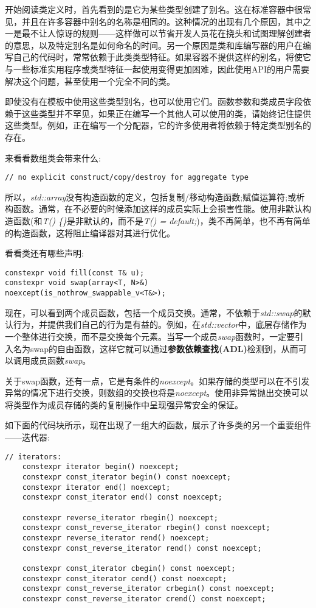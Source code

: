 开始阅读类定义时，首先看到的是它为某些类型创建了别名。这在标准容器中很常见，并且在许多容器中别名的名称是相同的。这种情况的出现有几个原因，其中之一是最不让人惊讶的规则——这样做可以节省开发人员花在挠头和试图理解创建者的意思，以及特定别名是如何命名的时间。另一个原因是类和库编写器的用户在编写自己的代码时，常常依赖于此类类型特征。如果容器不提供这样的别名，将使它与一些标准实用程序或类型特征一起使用变得更加困难，因此使用API的用户需要解决这个问题，甚至使用一个完全不同的类。

即使没有在模板中使用这些类型别名，也可以使用它们。函数参数和类成员字段依赖于这些类型并不罕见，如果正在编写一个其他人可以使用的类，请始终记住提供这些类型。例如，正在编写一个分配器，它的许多使用者将依赖于特定类型别名的存在。

来看看数组类会带来什么:

\begin{lstlisting}[style=styleCXX]
// no explicit construct/copy/destroy for aggregate type
\end{lstlisting}

所以，\textit{std::array}没有构造函数的定义，包括复制/移动构造函数;赋值运算符;或析构函数。通常，在不必要的时候添加这样的成员实际上会损害性能。使用非默认构造函数(和\textit{T() \{\}}是非默认的，而不是\textit{T() = default;})，类不再简单，也不再有简单的构造函数，这将阻止编译器对其进行优化。

看看类还有哪些声明:

\begin{lstlisting}[style=styleCXX]
constexpr void fill(const T& u);
constexpr void swap(array<T, N>&) noexcept(is_nothrow_swappable_v<T&>);
\end{lstlisting}

现在，可以看到两个成员函数，包括一个成员交换。通常，不依赖于\textit{std::swap}的默认行为，并提供我们自己的行为是有益的。例如，在\textit{std::vector}中，底层存储作为一个整体进行交换，而不是交换每个元素。当写一个成员\textit{swap}函数时，一定要引入名为swap的自由函数，这样它就可以通过\textbf{参数依赖查找(ADL)}检测到，从而可以调用成员函数\textit{swap}。

关于swap函数，还有一点，它是有条件的\textit{noexcept}。如果存储的类型可以在不引发异常的情况下进行交换，则数组的交换也将是\textit{noexcept}。使用非异常抛出交换可以将类型作为成员存储的类的复制操作中呈现强异常安全的保证。

如下面的代码块所示，现在出现了一组大的函数，展示了许多类的另一个重要组件——迭代器:

\begin{lstlisting}[style=styleCXX]
	 // iterators:
	constexpr iterator begin() noexcept;
	constexpr const_iterator begin() const noexcept;
	constexpr iterator end() noexcept;
	constexpr const_iterator end() const noexcept;
	
	constexpr reverse_iterator rbegin() noexcept;
	constexpr const_reverse_iterator rbegin() const noexcept;
	constexpr reverse_iterator rend() noexcept;
	constexpr const_reverse_iterator rend() const noexcept;
	
	constexpr const_iterator cbegin() const noexcept;
	constexpr const_iterator cend() const noexcept;
	constexpr const_reverse_iterator crbegin() const noexcept;
	constexpr const_reverse_iterator crend() const noexcept;
\end{lstlisting}


